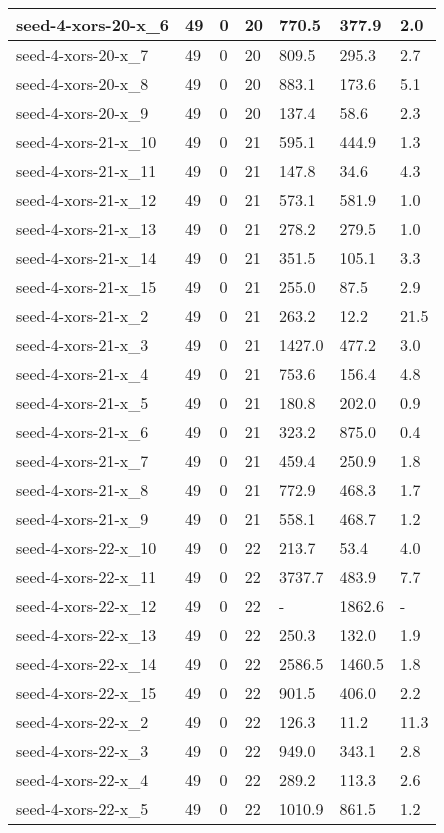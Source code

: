 \begin{scriptsize}
\begin{longtable}{|p{5cm}|l|l|l|l|l|l|}
seed-4-xors-20-x\_6&49&0&20&770.5&377.9&2.0 \\ \hline 
seed-4-xors-20-x\_7&49&0&20&809.5&295.3&2.7 \\ \hline 
seed-4-xors-20-x\_8&49&0&20&883.1&173.6&5.1 \\ \hline 
seed-4-xors-20-x\_9&49&0&20&137.4&58.6&2.3 \\ \hline 
seed-4-xors-21-x\_10&49&0&21&595.1&444.9&1.3 \\ \hline 
seed-4-xors-21-x\_11&49&0&21&147.8&34.6&4.3 \\ \hline 
seed-4-xors-21-x\_12&49&0&21&573.1&581.9&1.0 \\ \hline 
seed-4-xors-21-x\_13&49&0&21&278.2&279.5&1.0 \\ \hline 
seed-4-xors-21-x\_14&49&0&21&351.5&105.1&3.3 \\ \hline 
seed-4-xors-21-x\_15&49&0&21&255.0&87.5&2.9 \\ \hline 
seed-4-xors-21-x\_2&49&0&21&263.2&12.2&21.5 \\ \hline 
seed-4-xors-21-x\_3&49&0&21&1427.0&477.2&3.0 \\ \hline 
seed-4-xors-21-x\_4&49&0&21&753.6&156.4&4.8 \\ \hline 
seed-4-xors-21-x\_5&49&0&21&180.8&202.0&0.9 \\ \hline 
seed-4-xors-21-x\_6&49&0&21&323.2&875.0&0.4 \\ \hline 
seed-4-xors-21-x\_7&49&0&21&459.4&250.9&1.8 \\ \hline 
seed-4-xors-21-x\_8&49&0&21&772.9&468.3&1.7 \\ \hline 
seed-4-xors-21-x\_9&49&0&21&558.1&468.7&1.2 \\ \hline 
seed-4-xors-22-x\_10&49&0&22&213.7&53.4&4.0 \\ \hline 
seed-4-xors-22-x\_11&49&0&22&3737.7&483.9&7.7 \\ \hline 
seed-4-xors-22-x\_12&49&0&22&-&1862.6&- \\ \hline 
seed-4-xors-22-x\_13&49&0&22&250.3&132.0&1.9 \\ \hline 
seed-4-xors-22-x\_14&49&0&22&2586.5&1460.5&1.8 \\ \hline 
seed-4-xors-22-x\_15&49&0&22&901.5&406.0&2.2 \\ \hline 
seed-4-xors-22-x\_2&49&0&22&126.3&11.2&11.3 \\ \hline 
seed-4-xors-22-x\_3&49&0&22&949.0&343.1&2.8 \\ \hline 
seed-4-xors-22-x\_4&49&0&22&289.2&113.3&2.6 \\ \hline 
seed-4-xors-22-x\_5&49&0&22&1010.9&861.5&1.2 \\ \hline 

\end{longtable}
\end{scriptsize}
